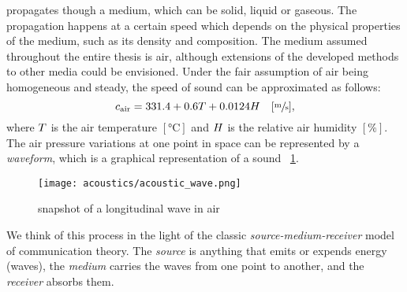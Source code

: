  propagates though a medium, which can be solid, liquid or gaseous.
The propagation happens at a certain speed which depends on the physical properties of the medium, such as its density and composition.
The medium assumed throughout the entire thesis is air, although extensions of the developed methods to other media could be envisioned.
Under the fair assumption of air being homogeneous and steady,
the speed of sound can be approximated as follows:
\begin{equation}
    c_\text{air} =  331.4 + 0.6T + 0.0124H \hspace{1em} [\sfrac{\si{\metre}}{\si{\second}}]
    ,
\end{equation}
where $T$ is the air temperature $[\si{\celsius}]$ and $H$ is the relative air humidity $[\%]$.
The air pressure variations at one point in space can be represented by a \textit{waveform}, which is a graphical representation of a sound
~\cref{fig:acoustics:acoustics_wave}.
\begin{figure}[h]
    \centering
    \texttt{[image: acoustics/acoustic\_wave.png]}
    \caption{snapshot of a longitudinal wave in air}
    \label{fig:acoustics:acoustics_wave}
\end{figure}

We think of this process in the light of the classic \textit{source-medium-receiver} model of communication theory.
The \textit{source} is anything that emits or expends energy (waves),
the \textit{medium} carries the waves from one point to another, and the \textit{receiver} absorbs them.


